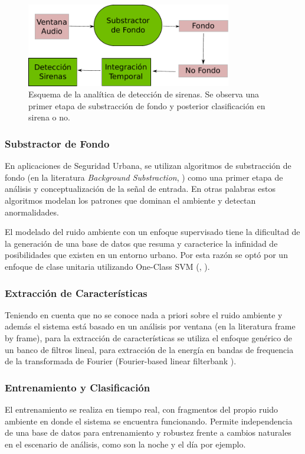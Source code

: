 \documentclass{article}
\begin{document}
\begin{figure}[h]
\begin{center}
\includegraphics[width=0.8\textwidth]{deteccion_sirenas} 
\caption{Esquema de la analítica de detección de sirenas. Se observa una primer etapa de substracción de fondo y posterior clasificación en sirena o no.}
\label{fig:deteccion_sirenas}
\end{center}
\end{figure}

\subsubsection{Substractor de Fondo}
En aplicaciones de Seguridad Urbana, se utilizan algoritmos de substracción de fondo (en la literatura \textit{Background Substraction}, \cite{crocco2014audio}) como una primer etapa de análisis y conceptualización de la señal de entrada. En otras palabras estos algoritmos modelan los patrones que dominan el ambiente y detectan anormalidades.
\bigskip 

El modelado del ruido ambiente con un enfoque supervisado tiene la dificultad de la generación de una base de datos que resuma y caracterice la infinidad de posibilidades que existen en un entorno urbano. Por esta razón se optó por un enfoque de clase unitaria utilizando One-Class SVM (\cite{rabaoui2008one}, \citep{lecomte2011abnormal}).

\subsubsection*{Extracción de Características}
Teniendo en cuenta que no se conoce nada a priori sobre el ruido ambiente y además el sistema está basado en un análisis por ventana (en la literatura frame by frame), para la extracción de características se utiliza el enfoque genérico de un banco de filtros lineal, para extracción de la energía en bandas de frequencia de la transformada de Fourier (Fourier-based linear filterbank \citep{lecomte2011abnormal}).

\subsubsection*{Entrenamiento y Clasificación}
El entrenamiento se realiza en tiempo real, con fragmentos del propio ruido ambiente en donde el sistema se encuentra funcionando. Permite independencia de una base de datos para entrenamiento y robustez frente a cambios naturales en el escenario de análisis, como son la noche y el día por ejemplo. 
\bigskip
\end{document}
